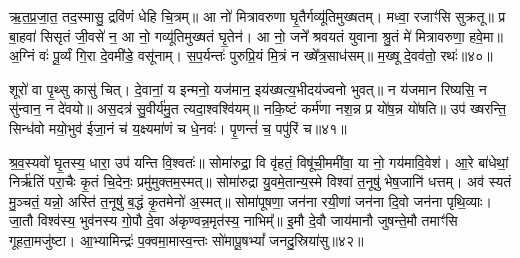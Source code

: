 ऋ॒त॒प्र॒जा॒त॒ तद॒स्मासु॒ द्रवि॑णं धेहि चि॒त्रम्॥ आ नो॑ मित्रावरुणा घृ॒तैर्गव्यू॑तिमुख्षतम्। मध्वा॒ रजाꣳ॑सि सुक्रतू॥ प्र बा॒हवा॑ सिसृतं जी॒वसे॑ न॒ आ नो॒ गव्यू॑तिमुख्षतं घृ॒तेन॑। आ नो॒ जने᳚ श्रवयतं युवाना श्रु॒तं मे॑ मित्रावरुणा॒ हवे॒मा॥ अ॒ग्निं वः॑ पू॒र्व्यं गि॒रा दे॒वमी॑डे॒ वसू॑नाम्। स॒प॒र्यन्तः॑ पुरुप्रि॒यं मि॒त्रं न ख्षे᳚त्र॒साध॑सम्॥ म॒ख्षू दे॒वव॑तो॒ रथः॑॥४०॥

शूरो॑ वा पृ॒थ्सु कासु॑ चित्। दे॒वानां॒ य इन्मनो॒ यज॑मान॒ इय॑ख्षत्य॒भीदय॑ज्वनो भुवत्॥ न य॑जमान रिष्यसि॒ न सु॑न्वान॒ न दे॑वयो॥ अस॒दत्र॑ सु॒वीर्य॑मु॒त त्यदा॒श्वश्वि॑यम्॥ नकि॒ष्टं कर्म॑णा नश॒न्न प्र यो॑ष॒न्न यो॑षति॥ उप॑ ख्षरन्ति॒ सिन्ध॑वो मयो॒भुव॑ ईजा॒नं च॑ य॒क्ष्यमा॑णं च धे॒नवः॑। पृ॒णन्तं॑ च॒ पपु॑रिं च॥४१॥

श्र॒व॒स्यवो॑ घृ॒तस्य॒ धारा॒ उप॑ यन्ति वि॒श्वतः॑॥ सोमा॑रुद्रा॒ वि वृ॑हतं॒ विषू॑ची॒ममी॑वा॒ या नो॒ गय॑मावि॒वेश॑। आ॒रे बा॑धेथां॒ निर्\mbox{}ऋ॑तिं परा॒चैः कृ॒तं चि॒देनः॒ प्रमु॑मुक्तम॒स्मत्॥ सोमा॑रुद्रा यु॒वमे॒तान्य॒स्मे विश्वा॑ त॒नूषु॑ भेष॒जानि॑ धत्तम्। अव॑ स्यतं मु॒ञ्चतं॒ यन्नो॒ अस्ति॑ त॒नूषु॑ ब॒द्धं कृ॒तमेनो॑ अ॒स्मत्॥ सोमा॑पूषणा॒ जन॑ना रयी॒णां जन॑ना दि॒वो जन॑ना पृथि॒व्याः। जा॒तौ विश्व॑स्य॒ भुव॑नस्य गो॒पौ दे॒वा अ॑कृण्वन्न॒मृत॑स्य॒ नाभिम्᳚॥ इ॒मौ दे॒वौ जाय॑मानौ जुषन्ते॒मौ तमाꣳ॑सि गूहता॒मजु॑ष्टा। आ॒भ्यामिन्द्रः॑ प॒क्वमा॒मास्व॒न्तः सो॑मापू॒ष\-भ्यां᳚ जनदु॒स्रिया॑सु॥४२॥

{\anuvakamend[{बृ॒ह॒तः शव॑सा॒ रथः॒ पपु॑रिं च दि॒वो जन॑ना॒ पञ्च॑विꣳशतिश्च॥22॥}]}


{}

